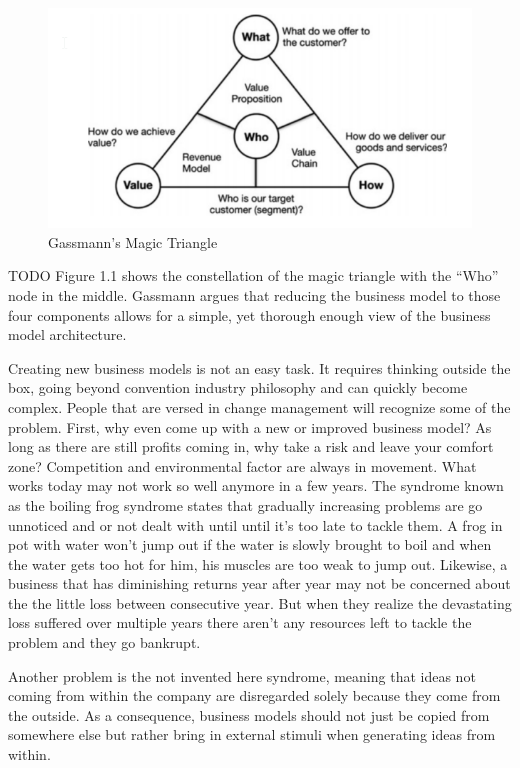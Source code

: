 		\begin{figure}[ht]
		    \begin{center}
		    \includegraphics[scale=0.6]{Talk11/Figure1.png}
		    \end{center}
		    \caption{Gassmann's Magic Triangle}
		    \label{Magic Triangle}
		\end{figure}
		TODO Figure 1.1 shows the constellation of the magic triangle with the ``Who'' node in the middle.
		Gassmann argues that reducing the business model to those four components allows for a simple, yet thorough enough view of the business model architecture.

		Creating new business models is not an easy task. It requires thinking outside the box, going beyond convention industry philosophy and can quickly become complex. People that are versed in change management will recognize some of the problem. First, why even come up with a new or improved business model? As long as there are still profits coming in, why take a risk and leave your comfort zone? Competition and environmental factor are always in movement. What works today may not work so well anymore in a few years. The syndrome known as the boiling frog syndrome states that gradually increasing problems are go unnoticed and or not dealt with until until it's too late to tackle them. A frog in pot with water won't jump out if the water is slowly brought to boil and when the water gets too hot for him, his muscles are too weak to jump out. Likewise, a business that has diminishing returns year after year may not be concerned about the the little loss between consecutive year. But when they realize the devastating loss suffered over multiple years there aren't any resources left to tackle the problem and they go bankrupt.

		Another problem is the not invented here syndrome, meaning that ideas not coming from within the company are disregarded solely because they come from the outside. As a consequence, business models should not just be copied from somewhere else but rather bring in external stimuli when generating ideas from within.

